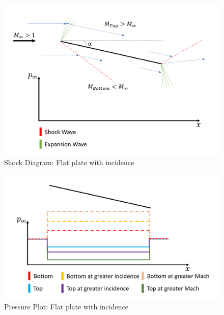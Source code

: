 \documentclass[../main.tex]{subfiles}
\begin{document}
\begin{figure}[h!]
    \centering
    \includegraphics[scale=0.5]{../../images/problem_2/fig_21.png}
    \caption{Shock Diagram: Flat plate with incidence}
    \label{incidence_shock}
\end{figure}

\begin{figure}[h!]
    \centering
    \includegraphics[scale=0.5]{../../images/problem_2/fig_22.png}
    \caption{Pressure Plot: Flat plate with incidence}
    \label{incidence_pressure}
\end{figure}
\end{document}

